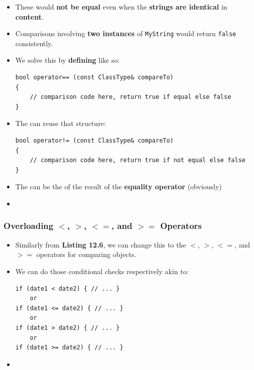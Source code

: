 \documentclass[10pt]{article}
\begin{document}
\begin{itemize}
\item These would \textbf{not be equal} even when the \textbf{strings are identical} in \textbf{content}.

\item Comparisons involving \textbf{two instances} of \verb|MyString| would return \verb|false| consistently.

\item We solve this by \textbf{defining} \textbf{} like so:

	\begin{verbatim}
bool operator== (const ClassType& compareTo)
{
	// comparison code here, return true if equal else false
}
	\end{verbatim}

\item The \textbf{} can reuse that structure:
\begin{verbatim}
bool operator!= (const ClassType& compareTo)
{
	// comparison code here, return true if not equal else false
}
\end{verbatim}

\item The  can be the \textbf{} of the result of the \textbf{equality operator} (obviously)

\item {}

	\end{itemize}

	\newpage

\subsubsection{Overloading $<$, $>$, $<=$, and $>=$ Operators}
\begin{itemize}
	\item Similarly from \textbf{Listing 12.6}, we can change this to the $<$, $>$, $<=$, and $>=$ operators for comparing objects.

	\item We can do those conditional checks respectively akin to:
	\begin{verbatim}
if (date1 < date2) { // ... }
	or
if (date1 <= date2) { // ... }
	or
if (date1 > date2) { // ... }
	or
if (date1 >= date2) { // ... }
	\end{verbatim}

\item {}
\end{itemize}
\end{document}
